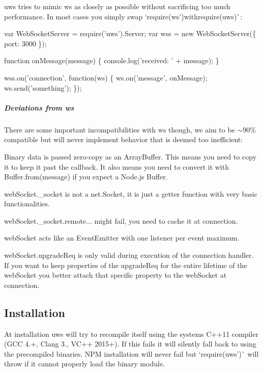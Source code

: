 {\ttfamily uws} tries to mimic {\ttfamily ws} as closely as possible without sacrificing too much performance. In most cases you simply swap `require(\textquotesingle{}ws'){\ttfamily with}require(\textquotesingle{}uws\textquotesingle{})\`{}\+:


\begin{DoxyCode}
var WebSocketServer = require('uws').Server;
var wss = new WebSocketServer(\{ port: 3000 \});

function onMessage(message) \{
    console.log('received: ' + message);
\}

wss.on('connection', function(ws) \{
    ws.on('message', onMessage);
    ws.send('something');
\});
\end{DoxyCode}


\subparagraph*{Deviations from ws}

There are some important incompatibilities with {\ttfamily ws} though, we aim to be $\sim$90\% compatible but will never implement behavior that is deemed too inefficient\+:


\begin{DoxyItemize}
\item Binary data is passed zero-\/copy as an {\ttfamily Array\+Buffer}. This means you need to copy it to keep it past the callback. It also means you need to convert it with {\ttfamily Buffer.\+from(message)} if you expect a {\ttfamily Node.\+js Buffer}.
\item {\ttfamily web\+Socket.\+\_\+socket} is not a {\ttfamily net.\+Socket}, it is just a getter function with very basic functionalities.
\item {\ttfamily web\+Socket.\+\_\+socket.\+remote...} might fail, you need to cache it at connection.
\item {\ttfamily web\+Socket} acts like an {\ttfamily Event\+Emitter} with one listener per event maximum.
\item {\ttfamily web\+Socket.\+upgrade\+Req} is only valid during execution of the connection handler. If you want to keep properties of the upgrade\+Req for the entire lifetime of the web\+Socket you better attach that specific property to the web\+Socket at connection.
\end{DoxyItemize}

\subsection*{Installation}

\href{https://www.npmjs.com/package/uws}{\tt }

At installation {\ttfamily uws} will try to recompile itself using the system\textquotesingle{}s C++11 compiler (G\+CC 4.+, Clang 3., V\+C++ 2015+). If this fails it will silently fall back to using the precompiled binaries. N\+PM installation will never fail but `require(\textquotesingle{}uws')\`{} will throw if it cannot properly load the binary module. 
